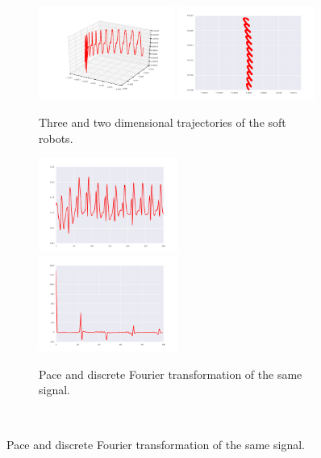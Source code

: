 \documentclass{sig-alternate}
\begin{document}
\begin{figure}[t!]
\centering
\begin{subfigure}[b]{0.47\textwidth}
\centering
\includegraphics[width=0.49\textwidth]{../Figures/Behaviors/3d.pdf}
\includegraphics[width=0.49\textwidth]{../Figures/Behaviors/2d.pdf}
\caption{Three and two dimensional trajectories of the soft robots.}
\end{subfigure}
\begin{subfigure}[t]{0.23\textwidth}
\centering
\includegraphics[width=0.5\textwidth]{../Figures/Behaviors/pace.pdf}~
\includegraphics[width=0.5\textwidth]{../Figures/Behaviors/pacedft.pdf}
\caption{Pace and discrete Fourier transformation of the same signal.}
\end{subfigure}~

\end{figure}
\end{document}
